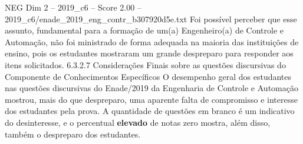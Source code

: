 \begin{textsample}{NEG Dim 2 – 2019\_c6 – Score 2.00 – 2019\_c6/enade\_2019\_eng\_contr\_b307920d5e.txt}
Foi possível perceber que esse assunto, fundamental para a formação de um(a) Engenheiro(a) de Controle e Automação, não foi ministrado de forma adequada na maioria das instituições de ensino, pois os estudantes mostraram um grande despreparo para responder aos itens solicitados. 6.3.2.7 Considerações Finais sobre as questões discursivas do Componente de Conhecimentos Específicos O desempenho geral dos estudantes nas questões discursivas do Enade/2019 da Engenharia de Controle e Automação mostrou, mais do que despreparo, uma aparente falta de compromisso e interesse dos estudantes pela prova.
A quantidade de questões em branco é um indicativo do desinteresse, e o percentual \textbf{elevado} de notas zero mostra, além disso, também o despreparo dos estudantes.

\end{textsample}
